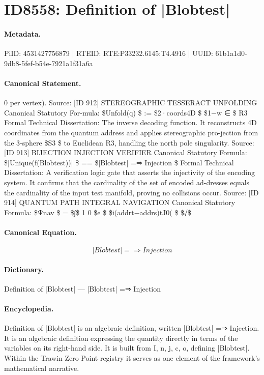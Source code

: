 \section*{ID8558: Definition of |Blobtest|}
\paragraph{Metadata.}
PiID: 4531427756879 | RTEID: RTE:P33232.6145:T4.4916 | UUID: 61b1a1d0-9db8-5fef-b54e-7921a1f31a6a

\paragraph{Canonical Statement.}
0 per vertex). Source: [ID 912] STEREOGRAPHIC TESSERACT UNFOLDING Canonical Statutory For-mula: \$Unfold(q) \$ := \$2·coords4D \$ \$1−w ∈ \$ R3 Formal Technical Dissertation: The inverse decoding function. It reconstructs 4D coordinates from the quantum address and applies stereographic pro-jection from the 3-sphere \$S3 \$ to Euclidean R3, handling the north pole singularity. Source: [ID 913] BIJECTION INJECTION VERIFIER Canonical Statutory Formula: \$|Unique(f(Blobtest))| \$ == \$|Blobtest| =⇒ Injection \$ Formal Technical Dissertation: A verification logic gate that asserts the injectivity of the encoding system. It confirms that the cardinality of the set of encoded ad-dresses equals the cardinality of the input test manifold, proving no collisions occur. Source: [ID 914] QUANTUM PATH INTEGRAL NAVIGATION Canonical Statutory Formula: \$Ψnav \$ = \$∫\$ 1 0 \$e \$ \$i(addrt−addrs)tJ0( \$ \$√\$

\paragraph{Canonical Equation.}
\[
|Blobtest| =⇒ Injection
\]

\paragraph{Dictionary.}
Definition of |Blobtest| — |Blobtest| =⇒ Injection

\paragraph{Encyclopedia.}
Definition of |Blobtest| is an algebraic definition, written |Blobtest| =⇒ Injection. It is an algebraic definition expressing the quantity directly in terms of the variables on its right-hand side. It is built from I, n, j, c, o, defining |Blobtest|. Within the Trawin Zero Point registry it serves as one element of the framework's mathematical narrative.
